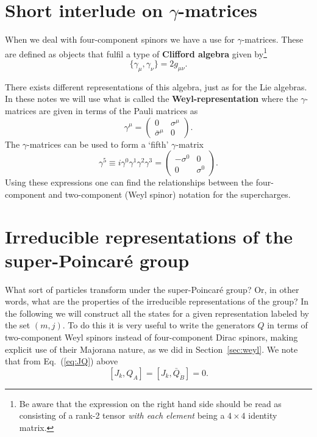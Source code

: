 \documentclass[notes.tex]{subfiles}
\begin{document}
\section{Short interlude on $\gamma$-matrices}
\label{sec:gammamatrices}
When we deal with four-component spinors we have a use for $\gamma$-matrices. These are defined as objects that fulfil a type of {\bf Clifford algebra} given by\footnote{Be aware that the expression on the right hand side should be read as consisting of a rank-2 tensor {\it with each element} being a $4\times4$ identity matrix.}
\begin{equation}
\{\gamma_\mu,\gamma_\nu\}=2g_{\mu\nu}.
\end{equation}

There exists different representations of this algebra, just as for the Lie algebras. In these notes we will use what is called the {\bf Weyl-representation} where the $\gamma$-matrices are given in terms of the Pauli matrices as
\begin{equation}
\gamma^\mu=\left(\begin{matrix} 0 & \sigma^\mu \\ \bar\sigma^\mu & 0 \end{matrix}\right).
\end{equation}
The $\gamma$-matrices can be used to form a `fifth'  $\gamma$-matrix
\[ \gamma^5\equiv i\gamma^0\gamma^1\gamma^2\gamma^3=\left(\begin{matrix} -\sigma^0 & 0 \\ 0 & \sigma^0 \end{matrix}\right). \]
Using these expressions one can find the relationships between the four-component and two-component (Weyl spinor) notation for the supercharges.


\section{Irreducible representations of the super-Poincaré group}
\label{sec:superalgebrarep}
What sort of particles transform under the super-Poincaré group? Or, in other words, what are the properties of the irreducible representations of the group? 
In the following we will construct all the states for a given representation labeled by the set $(m,j)$. To do this it is very useful to write the generators $Q$ in terms of two-component Weyl spinors instead of four-component Dirac spinors, making explicit use of their Majorana nature, as we did in Section~\ref{sec:weyl}. We note that from Eq.~(\ref{eq:JQ}) above 
\[[J_k, Q_A] = [J_k, \bar{Q}_{\dot{B}}] = 0.\]
\end{document}
